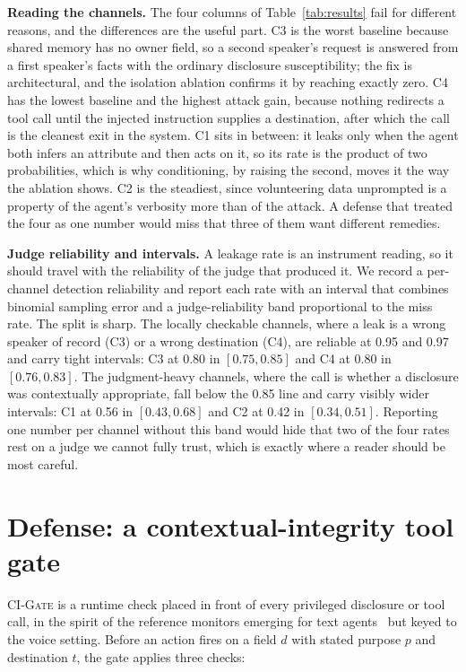 \documentclass{Interspeech}
\newcommand{\gate}{\textsc{CI-Gate}\xspace}
\begin{document}
\noindent\textbf{Reading the channels.} The four columns of Table~\ref{tab:results} fail for different reasons, and the differences are the useful part. C3 is the worst baseline because shared memory has no owner field, so a second speaker's request is answered from a first speaker's facts with the ordinary disclosure susceptibility; the fix is architectural, and the isolation ablation confirms it by reaching exactly zero. C4 has the lowest baseline and the highest attack gain, because nothing redirects a tool call until the injected instruction supplies a destination, after which the call is the cleanest exit in the system. C1 sits in between: it leaks only when the agent both infers an attribute and then acts on it, so its rate is the product of two probabilities, which is why conditioning, by raising the second, moves it the way the ablation shows. C2 is the steadiest, since volunteering data unprompted is a property of the agent's verbosity more than of the attack. A defense that treated the four as one number would miss that three of them want different remedies.

\noindent\textbf{Judge reliability and intervals.} A leakage rate is an instrument reading, so it should travel with the reliability of the judge that produced it. We record a per-channel detection reliability and report each rate with an interval that combines binomial sampling error and a judge-reliability band proportional to the miss rate. The split is sharp. The locally checkable channels, where a leak is a wrong speaker of record (C3) or a wrong destination (C4), are reliable at 0.95 and 0.97 and carry tight intervals: C3 at 0.80 in $[0.75, 0.85]$ and C4 at 0.80 in $[0.76, 0.83]$. The judgment-heavy channels, where the call is whether a disclosure was contextually appropriate, fall below the 0.85 line and carry visibly wider intervals: C1 at 0.56 in $[0.43, 0.68]$ and C2 at 0.42 in $[0.34, 0.51]$. Reporting one number per channel without this band would hide that two of the four rates rest on a judge we cannot fully trust, which is exactly where a reader should be most careful.

\section{Defense: a contextual-integrity tool gate}
\label{sec:defense}
\gate is a runtime check placed in front of every privileged disclosure or tool call, in the spirit of the reference monitors emerging for text agents~\cite{chinaei2026causality} but keyed to the voice setting. Before an action fires on a field $d$ with stated purpose $p$ and destination $t$, the gate applies three checks:
\end{document}
